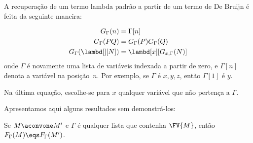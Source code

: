 \documentclass[../../../include/open-logic-section]{subfiles}
\begin{document}
A recuperação de um termo lambda padrão a partir de um termo de De Bruijn é
feita da seguinte maneira:

\begin{defn}
  \begin{align*}
    G_\Gamma(n) &= \Gamma[n] \\
    G_\Gamma(PQ) &= G_\Gamma(P) G_\Gamma(Q) \\
    G_\Gamma(\lambd[][N]) &= \lambd[x][G_{x,\Gamma}(N)]
  \end{align*}
  onde $\Gamma$ é novamente uma lista de variáveis indexada a partir de zero,
  e $\Gamma[n]$ denota a variável na posição~$n$. Por exemplo, se $\Gamma$ é
  $x,y,z$, então $\Gamma[1]$ é $y$.

  Na última equação, escolhe-se para $x$ qualquer variável que não pertença a
  $\Gamma$.
\end{defn}

Apresentamos aqui alguns resultados sem demonstrá-los:

\begin{prop}
  Se $M \aconvone M'$ e $\Gamma$ é qualquer lista que contenha $\FV{M}$,
  então $F_\Gamma(M) \eqs F_\Gamma(M')$.
\end{prop}
\end{document}
